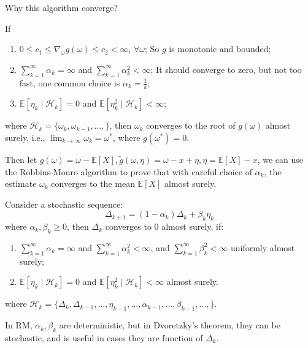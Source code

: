 \documentclass[10pt]{elegantbook}
\begin{document}
Why this algorithm converge?
\begin{theorem}
    If
    \begin{enumerate}
        \item $0 \leq c_1 \leq \nabla_{\omega}g(\omega) \leq c_2 < \infty$, $\forall \omega$; So $g$ is monotonic and bounded;
        \item $\sum_{k=1}^{\infty} \alpha_k = \infty$ and $\sum_{k=1}^{\infty} \alpha_k^2 < \infty$; It should converge to zero, but not too fast, one 
        common choice is $\alpha_k = \frac{1}{k}$;
        \item $\mathbb E[\eta_k \mid \mathcal H_k] = 0$ and $\mathbb E[\eta_k^2 \mid \mathcal H_k] < \infty$;
    \end{enumerate}
    where $\mathcal H_k = \{ \omega_k, \omega_{k-1}, \ldots, \}$, then $\omega_k$ converges to the root of $g(\omega)$ almost surely, i.e., 
    $\lim_{k \rightarrow \infty} \omega_k = \omega^*$, where $g(\omega^*) = 0$.
\end{theorem}

Then let $g(\omega) = \omega - \mathbb E[X], \tilde g(\omega, \eta) = \omega - x + \eta, \eta = \mathbb E[X] - x$, 
we can use the Robbins-Monro algorithm to prove that with careful choice of $\alpha_k$, the estimate $\omega_k$ converges to the mean $\mathbb E[X]$ almost surely.

\begin{theorem}
    Consider a stochastic sequence:
    \[ \Delta_{k+1} = (1 - \alpha_k) \Delta_k + \beta_k \eta_k \]
    where $\alpha_k, \beta_k \geq 0$, then  $\Delta_k$ converges to 0 almost surely, if:
    \begin{enumerate}
        \item $\sum_{k=1}^{\infty} \alpha_k = \infty$ and $\sum_{k=1}^{\infty} \alpha_k^2 < \infty$, and $\sum_{k=1}^{\infty} \beta_k^2 < \infty$ uniformly almost surely;
        \item $\mathbb E[\eta_k \mid \mathcal H_k] = 0$ and $\mathbb E[\eta_k^2 \mid \mathcal H_k] < \infty$ almost surely.
    \end{enumerate}
    where $\mathcal H_k = \{ \Delta_k, \Delta_{k-1}, \ldots, \eta_{k-1}, \ldots, \alpha_{k-1}, \ldots, \beta_{k-1}, \ldots, \}$.
    
    In RM, $\alpha_k, \beta_k$ are deterministic, but in Dvoretzky's theorem, they can be stochastic, and is useful in cases they are function of $\Delta_k$.
\end{theorem}
\end{document}

